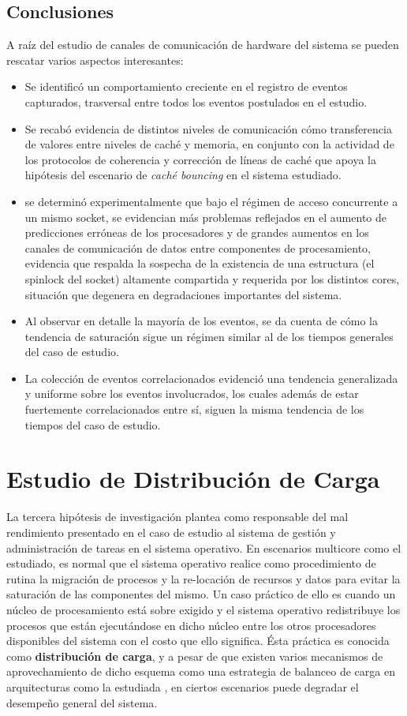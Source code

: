 \subsection{Conclusiones}
A raíz del estudio de canales de comunicación de hardware del sistema se pueden rescatar varios aspectos interesantes:
\begin{itemize}
\item Se identificó un comportamiento creciente en el registro de eventos capturados, trasversal entre todos los eventos postulados en el estudio.
\item Se recabó evidencia de distintos niveles de comunicación cómo transferencia de valores entre niveles de caché y memoria, en conjunto con la actividad de los protocolos de coherencia y corrección de líneas de caché que apoya la hipótesis del escenario de \emph{caché bouncing} en el sistema estudiado.
\item se determinó experimentalmente que bajo el régimen de acceso concurrente a un mismo socket, se evidencian más problemas reflejados en el aumento de predicciones erróneas de los procesadores y de grandes aumentos en los canales de comunicación de datos entre componentes de procesamiento, evidencia que respalda la sospecha de la existencia de una estructura (el spinlock del socket) altamente compartida y requerida por los distintos cores, situación que degenera en degradaciones importantes del sistema.
\item Al observar en detalle la mayoría de los eventos, se da cuenta de cómo la tendencia de saturación sigue un régimen similar al de los tiempos generales del caso de estudio.
\item La colección de eventos correlacionados evidenció una tendencia generalizada y uniforme sobre los eventos involucrados, los cuales además de estar fuertemente correlacionados entre sí, siguen la misma tendencia de los tiempos del caso de estudio.
\end{itemize}


\section{Estudio de Distribución de Carga}
La tercera hipótesis de investigación plantea como responsable del mal rendimiento presentado en el caso de estudio al sistema de gestión y administración de tareas en el sistema operativo. En escenarios multicore como el estudiado, es normal que el sistema operativo realice como procedimiento de rutina la migración de procesos y la re-locación de recursos y datos para evitar la saturación de las componentes del mismo. Un caso práctico de ello es cuando un núcleo de procesamiento está sobre exigido y el sistema operativo redistribuye los procesos que están ejecutándose en dicho núcleo entre los otros procesadores disponibles del sistema con el costo que ello significa. Ésta práctica es conocida como \textbf{distribución de carga}, y a pesar de que existen varios mecanismos de aprovechamiento de dicho esquema como una estrategia de balanceo de carga en arquitecturas como la estudiada \cite{paper:NUMA}, en ciertos escenarios puede degradar el desempeño general del sistema.

